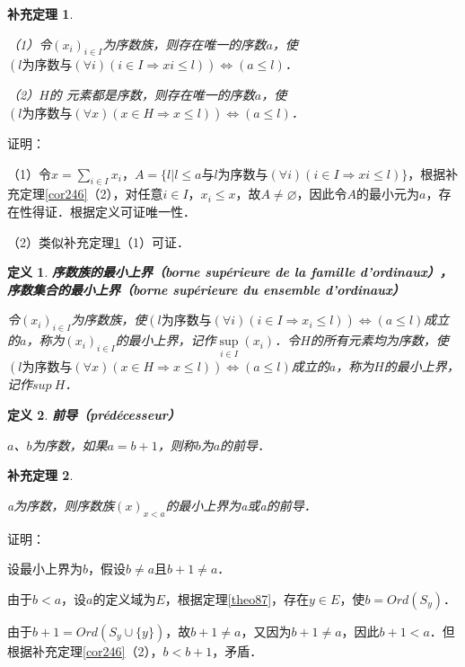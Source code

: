 \documentclass[12pt, a4paper, oneside]{book}
\newtheorem{cor}{补充定理}
\newtheorem{de}{定义}
\begin{document}
			\begin{cor}\label{cor254}
				\hfill\par
				（1）令$(x_i)_{i\in I}$为序数族，则存在唯一的序数$a$，使$(l\text{为序数}\text{与}(\forall i)(i\in I\Rightarrow xi\leq l))\Leftrightarrow (a\leq l)$．
				\par
				（2）$H$的 元素都是序数，则存在唯一的序数$a$，使$(l\text{为序数}\text{与}(\forall x)(x\in H\Rightarrow x\leq l))\Leftrightarrow (a\leq l)$．
			\end{cor}
			证明：
			\par
			（1）令$x=\sum\limits_{i\in I}x_i$，$A=\{l|l\leq a\text{与}l\text{为序数}\text{与}(\forall i)(i\in I\Rightarrow xi\leq l)\}$，根据补充定理\ref{cor246}（2），对任意$i\in I$，$x_i\leq x$，故$A\neq \varnothing$，因此令$A$的最小元为$a$，存在性得证．根据定义可证唯一性．
			\par
			（2）类似补充定理\ref{cor254}（1）可证．
									
			\begin{de}
				\textbf{序数族的最小上界（borne supérieure de la famille d'ordinaux），序数集合的最小上界（borne supérieure du ensemble d'ordinaux）}
				\par
				令$(x_i)_{i\in I}$为序数族，使$(l\text{为序数}\text{与}(\forall i)(i\in I\Rightarrow x_i\leq l))\Leftrightarrow (a\leq l)$成立的$a$，称为$(x_i)_{i\in I}$的最小上界，记作$\mathop{sup}\limits_{i\in I}(x_i)$．令$H$的所有元素均为序数，使$(l\text{为序数}\text{与}(\forall x)(x\in H\Rightarrow x\leq l))\Leftrightarrow (a\leq l)$成立的$a$，称为$H$的最小上界，记作$sup\ H$．
			\end{de}
									
			\begin{de}
				\textbf{前导（prédécesseur）}
				\par
				$a$、$b$为序数，如果$a=b+1$，则称$b$为$a$的前导．
			\end{de}
			
			\begin{cor}\label{cor255}
				\hfill\par
				a为序数，则序数族$(x)_{x<a}$的最小上界为a或a的前导．
			\end{cor}
			证明：
			\par
			设最小上界为$b$，假设$b\neq a$且$b+1\neq a$．
			\par
			由于$b<a$，设$a$的定义域为$E$，根据定理\ref{theo87}，存在$y\in E$，使$b=Ord(S_y)$．
			\par
			由于$b+1=Ord(S_y\cup\{y\})$，故$b+1\neq a$，又因为$b+1\neq a$，因此$b+1<a$．但根据补充定理\ref{cor246}（2），$b<b+1$，矛盾．
						
\end{document}
